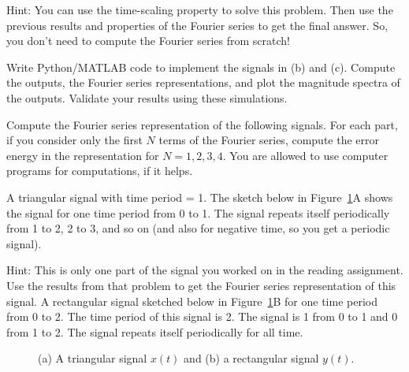 \documentclass{ee102_pset}
\begin{document}
Hint: You can use the time-scaling property to solve this problem. Then use the previous results and properties of the Fourier series to get the final answer. So, you don't need to compute the Fourier series from scratch!

\problempart[10 points] Write Python/MATLAB code to implement the signals in (b) and (c). Compute the outputs, the Fourier series representations, and plot the magnitude spectra of the outputs. Validate your results using these simulations. 

Compute the Fourier series representation of the following signals. For each part, if you consider only the first $N$ terms of the Fourier series, compute the error energy in the representation for $N=1,2,3,4$. You are allowed to use computer programs for computations, if it helps.

\problempart[15 points] A triangular signal with time period = 1. The sketch below in Figure~\ref{fig:problem2}A shows the signal for one time period from 0 to 1. The signal repeats itself periodically from 1 to 2, 2 to 3, and so on (and also for negative time, so you get a periodic signal).

Hint: This is only one part of the signal you worked on in the reading assignment. Use the results from that problem to get the Fourier series representation of this signal. 
\problempart[15 points] 
A rectangular signal sketched below in Figure~\ref{fig:problem2}B for one time period from 0 to 2. The time period of this signal is 2. The signal is 1 from 0 to 1 and 0 from 1 to 2. The signal repeats itself periodically for all time.

\begin{figure}[h]
\centering
\hspace{1.2cm}
\caption{(a) A triangular signal $x(t)$ and (b) a rectangular signal $y(t)$.}
\label{fig:problem2}
\end{figure}
\end{document}
